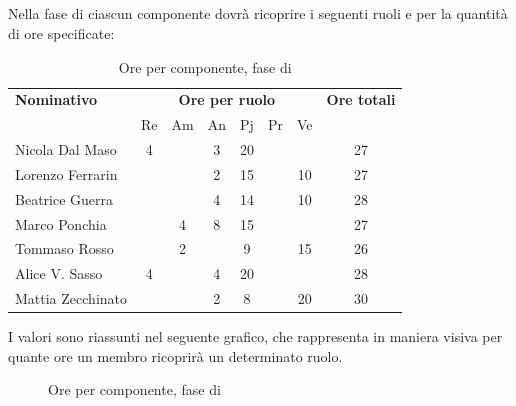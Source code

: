 \subsection{\PA}
Nella fase di \PA ciascun componente dovrà ricoprire i seguenti ruoli e per la quantità di ore specificate:

\begin{table}[H]
	\centering
	\begin{tabular}{|l|c|c|c|c|c|c|c|}
		\hline
		\textbf{Nominativo} & 
		\multicolumn{6}{c|}{\textbf{Ore per ruolo}} & 
		\textbf{Ore totali} \\
		& Re & Am & An & Pj & Pr & Ve & \\
		\hline
		Nicola Dal Maso &4 & &3 &20 & & & 27 \\
		Lorenzo Ferrarin & & &2 &15 & &10 & 27 \\
		Beatrice Guerra & & &4 &14 & &10 & 28 \\
		Marco Ponchia & &4 &8 &15 & & & 27 \\
		Tommaso Rosso & &2 & &9 & &15 & 26 \\
		Alice V. Sasso &4 & &4 &20 & & & 28 \\
		Mattia Zecchinato & & &2 &8 & &20 & 30 \\
		\hline
	\end{tabular}
	\caption{Ore per componente, fase di \PA}
\end{table}
I valori sono riassunti nel seguente grafico, che rappresenta in maniera visiva per quante ore un membro ricoprirà un determinato ruolo.
\begin{figure}[H]
	\centering
	\caption{Ore per componente, fase di \PA}
\end{figure}

